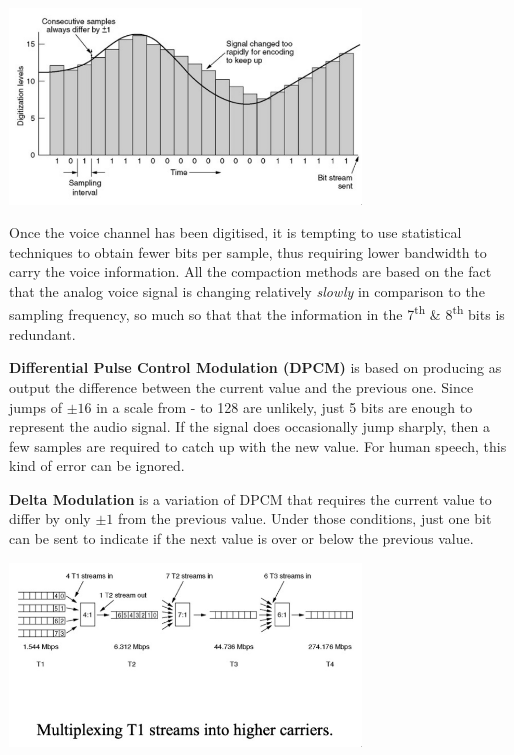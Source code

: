 \documentclass[11pt]{article}
\begin{document}
\begin{center}
    \includegraphics[width=0.7\textwidth]{tdm2.png}
\end{center}

Once the voice channel has been digitised, it is tempting to use statistical techniques to obtain fewer bits per sample, thus 
requiring lower bandwidth to carry the voice information. 
All the compaction methods are based on the fact that the analog voice signal is changing relatively \textit{slowly} in 
comparison to the sampling frequency, so much so that that the information in the 7\textsuperscript{th} \& 8\textsuperscript{th}
bits is redundant. 

\textbf{Differential Pulse Control Modulation (DPCM)} is based on producing as output the difference between the current value 
and the previous one. 
Since jumps of $\pm 16$ in a scale from - to 128 are unlikely, just 5 bits are enough to represent the audio signal. 
If the signal does occasionally jump sharply, then a few samples are required to catch up with the new value. 
For human speech, this kind of error can be ignored. 

\textbf{Delta Modulation} is a variation of DPCM that requires the current value to differ by only $\pm1$ from the previous 
value. 
Under those conditions, just one bit can be sent to indicate if the next value is over or below the previous value. 

\begin{center}
    \includegraphics[width=0.7\textwidth]{tdm3.png}
\end{center}
\end{document}
